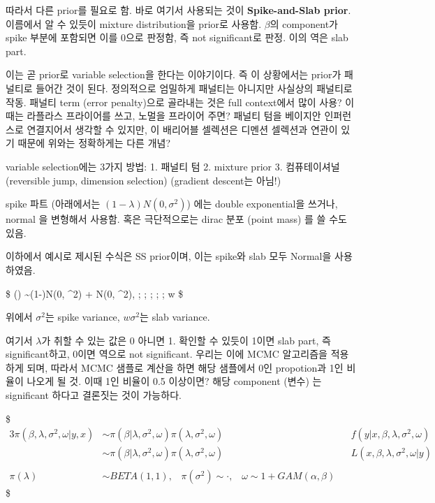 \documentclass[
]{book}
\begin{document}
따라서 다른 prior를 필요로 함. 바로 여기서 사용되는 것이 \textbf{Spike-and-Slab prior}. 이름에서 알 수 있듯이 mixture distribution을 prior로 사용함. \(\beta\)의 component가 spike 부분에 포함되면 이를 0으로 판정함, 즉 not significant로 판정. 이의 역은 slab part.

이는 곧 prior로 variable selection을 한다는 이야기이다. 즉 이 상황에서는 prior가 패널티로 들어간 것이 된다. 정의적으로 엄밀하게 패널티는 아니지만 사실상의 패널티로 작동. 패널티 term (error penalty)으로 골라내는 것은 full context에서 많이 사용? 이때는 라플라스 프라이어를 쓰고, 노멀을 프라이어 주면? 패널티 텀을 베이지안 인퍼런스로 연결지어서 생각할 수 있지만, 이 배리어블 셀렉션은 디멘션 셀렉션과 연관이 있기 때문에 위와는 정확하게는 다른 개념?

variable selection에는 3가지 방법:
1. 패널티 텀
2. mixture prior
3. 컴퓨테이셔널 (reversible jump, dimension selection) (gradient descent는 아님!)

spike 파트 (아래에서는 \((1-\lambda)N(0, \sigma^2)\)) 에는 double exponential을 쓰거나, normal 을 변형해서 사용함. 혹은 극단적으로는 dirac 분포 (point mass) 를 쓸 수도 있음.

이하에서 예시로 제시된 수식은 SS prior이며, 이는 spike와 slab 모두 Normal을 사용하였음.

\$
\pi(\beta) \sim (1-\lambda)N(0, \sigma\^{}2) + \lambda N(0, \omega \sigma\^{}2), ; ; ; ; ; w 
\$

위에서 \(\sigma^2\)는 spike variance, \(w \sigma^2\)는 slab variance.

여기서 \(\lambda\)가 취할 수 있는 값은 0 아니면 1. 확인할 수 있듯이 1이면 slab part, 즉 significant하고, 0이면 역으로 not significant. 우리는 이에 MCMC 알고리즘을 적용하게 되며, 따라서 MCMC 샘플로 계산을 하면 해당 샘플에서 0인 propotion과 1인 비율이 나오게 될 것. 이때 1인 비율이 0.5 이상이면? 해당 component (변수) 는 significant 하다고 결론짓는 것이 가능하다.

\$
\begin{alignat}{3}

\pi(\beta, \lambda, \sigma^2, \omega \vert y, x) &\sim \pi(\beta \vert \lambda, \sigma^2, \omega )  \pi(\lambda, \sigma^2, \omega) && f(y \vert x, \beta, \lambda, \sigma^2, \omega) \\
&\sim \pi(\beta \vert \lambda, \sigma^2, \omega )  \pi(\lambda, \sigma^2, \omega) &&L( x, \beta, \lambda, \sigma^2, \omega \vert y) \\

\\

\pi(\lambda) &\sim BETA(1,1), \; \; \; \pi(\sigma^2) \sim \cdot \tag{1}, \; \; \; \omega \sim 1 + GAM(\alpha, \beta)

\end{alignat}
\$
\end{document}
